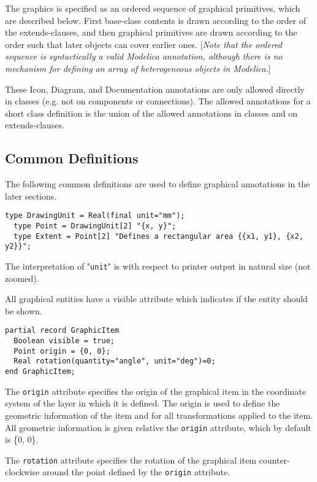The graphics is specified as an ordered sequence of graphical
primitives, which are described below. First base-class contents is
drawn according to the order of the extends-clauses, and then graphical
primitives are drawn according to the order such that later objects can
cover earlier ones. {[}\emph{Note that the ordered sequence is
syntactically a valid Modelica annotation, although there is no
mechanism for defining an array of heterogeneous objects in
Modelica.}{]}

These Icon, Diagram, and Documentation annotations are only allowed
directly in classes (e.g. not on components or connections). The allowed
annotations for a short class definition is the union of the allowed
annotations in classes and on extends-clauses.

\subsection{Common Definitions}

The following common definitions are used to define graphical
annotations in the later sections.

\begin{lstlisting}[language=modelica]
  type DrawingUnit = Real(final unit="mm");
  type Point = DrawingUnit[2] "{x, y}";
  type Extent = Point[2] "Defines a rectangular area {{x1, y1}, {x2, y2}}";
\end{lstlisting}
The interpretation of "\lstinline!unit!" is with respect to printer output in
natural size (not zoomed).

All graphical entities have a visible attribute which indicates if the
entity should be shown.

\begin{lstlisting}[language=modelica]
partial record GraphicItem
  Boolean visible = true;
  Point origin = {0, 0};
  Real rotation(quantity="angle", unit="deg")=0;
end GraphicItem;
\end{lstlisting}
The \lstinline!origin! attribute specifies the origin of the graphical item in the
coordinate system of the layer in which it is defined. The origin is
used to define the geometric information of the item and for all
transformations applied to the item. All geometric information is given
relative the \lstinline!origin! attribute, which by default is \{0, 0\}.

The \lstinline!rotation! attribute specifies the rotation of the graphical item
counter-clockwise around the point defined by the \lstinline!origin! attribute.

